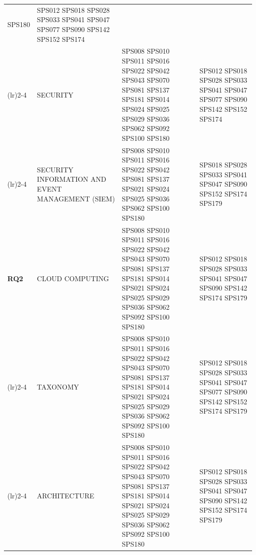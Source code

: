 \begin{table}[htbp]
\begin{tabularx}{\textwidth}{p{0.8cm}p{2.5cm}>{\raggedright\arraybackslash}X>{\raggedright\arraybackslash}X}
																	SPS180             							  & SPS012 SPS018 SPS028 SPS033 SPS041 SPS047 
																													SPS077 SPS090 SPS142 SPS152 SPS174                            \\
		\addlinespace[0.3em]
		\cmidrule(lr){2-4}	
		                                     & SECURITY       	  & SPS008 SPS010 SPS011 SPS016 SPS022 SPS042 
																	SPS043 SPS070 SPS081 SPS137 SPS181 SPS014 
																	SPS024 SPS025 SPS029 SPS036 SPS062 SPS092 
																	SPS100 SPS180                   			  & SPS012 SPS018 SPS028 SPS033 SPS041 SPS047 
																													SPS077 SPS090 SPS142 SPS152 SPS174                              \\
		\addlinespace[0.3em]
		\cmidrule(lr){2-4}	
        		                             & SECURITY INFORMATION 
											   AND EVENT MANAGEMENT 
											   (SIEM)          		& SPS008 SPS010 SPS011 SPS016 SPS022 SPS042 
																	  SPS081 SPS137	SPS021 SPS024 SPS025 SPS036 
																	  SPS062 SPS100 SPS180                   		& SPS018 SPS028 SPS033 SPS041 SPS047 SPS090 
																												  	  SPS152 SPS174	SPS179            				                 \\
		\multirow{0}{*}[1.2em]{\textbf{RQ2}} & CLOUD COMPUTING      & SPS008 SPS010 SPS011 SPS016 SPS022 SPS042 
																	  SPS043 SPS070 SPS081 SPS137 SPS181 SPS014 	
																	  SPS021 SPS024 SPS025 SPS029 SPS036 SPS062 
																	  SPS092 SPS100 SPS180                   		& SPS012 SPS018 SPS028 SPS033 SPS041 SPS047 	
																												  	  SPS090 SPS142 SPS174 SPS179             			             \\
		\addlinespace[0.3em]
		\cmidrule(lr){2-4}	
		                                     & TAXONOMY           & SPS008 SPS010 SPS011 SPS016 SPS022 SPS042 
																	SPS043 SPS070 SPS081 SPS137 SPS181 SPS014 
																	SPS021 SPS024 SPS025 SPS029 SPS036 SPS062 
																	SPS092 SPS100 SPS180                   		& SPS012 SPS018 SPS028 SPS033 SPS041 SPS047 
																												  SPS077 SPS090 SPS142 SPS152 SPS174 SPS179                       \\
		\addlinespace[0.3em]
		\cmidrule(lr){2-4}	
		                                     & ARCHITECTURE        & SPS008 SPS010 SPS011 SPS016 SPS022 SPS042 
																	 SPS043 SPS070 SPS081 SPS137 SPS181 SPS014 
																	 SPS021 SPS024 SPS025 SPS029 SPS036 SPS062 
																	 SPS092 SPS100 SPS180             			& SPS012 SPS018 SPS028 SPS033 SPS041 SPS047 
																												  SPS090 SPS142 SPS152 SPS174 SPS179      				            \\

\end{tabularx}
\end{table}
